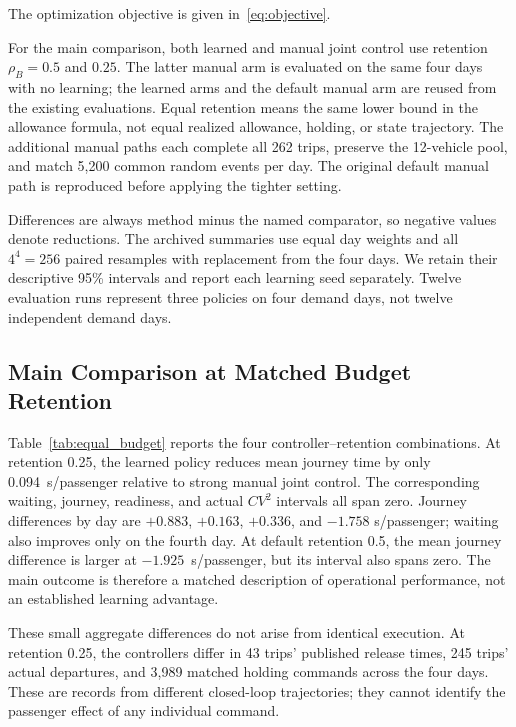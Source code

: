 The optimization objective is given in~\eqref{eq:objective}.

For the main comparison, both learned and manual joint control use retention
$\rho_B=0.5$ and $0.25$. The latter manual arm is evaluated on the same four
days with no learning; the learned arms and the default manual arm are reused
from the existing evaluations. Equal retention means the same lower bound in
the allowance formula, not equal realized allowance, holding, or state
trajectory. The additional manual paths each complete all 262 trips, preserve
the 12-vehicle pool, and match 5,200 common random events per day. The original
default manual path is reproduced before applying the tighter setting.

Differences are always method minus the named comparator, so negative values
denote reductions. The archived summaries use equal day weights and all $4^4=256$ paired
resamples with replacement from the four days. We retain their descriptive 95\% intervals
and report each learning seed separately. Twelve evaluation runs represent
three policies on four demand days, not twelve independent demand days.

\subsection{Main Comparison at Matched Budget Retention}
\label{sec:equal_budget}

Table~\ref{tab:equal_budget} reports the four controller--retention combinations.
At retention 0.25, the learned policy reduces mean journey time by only
0.094~s/passenger relative to strong manual joint control. The corresponding
waiting, journey, readiness, and actual $CV^2$ intervals all span zero.
Journey differences by day are $+0.883$, $+0.163$, $+0.336$, and $-1.758$
s/passenger; waiting also improves only on the fourth day. At default retention
0.5, the mean journey difference is larger at $-1.925$~s/passenger, but its
interval also spans zero. The main outcome is therefore a matched description
of operational performance, not an established learning advantage.



These small aggregate differences do not arise from identical execution. At
retention 0.25, the controllers differ in 43 trips' published release times,
245 trips' actual departures, and 3,989 matched holding commands across the
four days. These are records from different closed-loop trajectories; they
cannot identify the passenger effect of any individual command.

